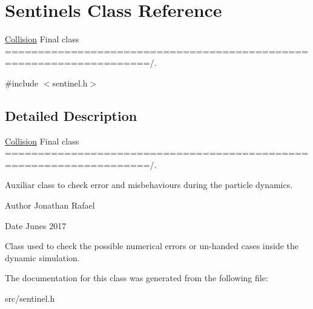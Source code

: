 \hypertarget{class_sentinels}{}\section{Sentinels Class Reference}
\label{class_sentinels}


\hyperlink{class_collision}{Collision} Final class ====================================================================/.  




{\ttfamily \#include $<$sentinel.\+h$>$}



\subsection{Detailed Description}
\hyperlink{class_collision}{Collision} Final class ====================================================================/. 

Auxiliar class to check error and misbehaviours during the particle dynamics. \begin{DoxyAuthor}{Author}
Jonathan Rafael 
\end{DoxyAuthor}
\begin{DoxyDate}{Date}
Junes 2017 


\end{DoxyDate}
Class used to check the possible numerical errors or un-\/handed cases inside the dynamic simulation. 

The documentation for this class was generated from the following file\+:\begin{DoxyCompactItemize}
\item 
src/sentinel.\+h\end{DoxyCompactItemize}

